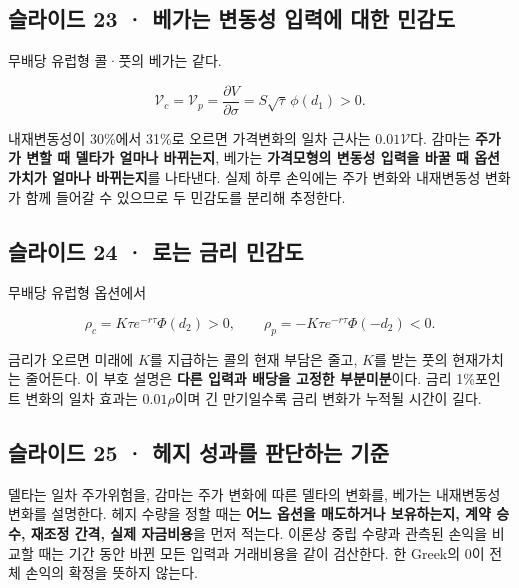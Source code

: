 \documentclass[11pt,a4paper]{article}
\begin{document}
\subsection{슬라이드 23 · 베가는 변동성 입력에 대한 민감도}
무배당 유럽형 콜·풋의 베가는 같다.\par

\[
\mathcal V_c=\mathcal V_p
=\frac{\partial V}{\partial\sigma}
=S\sqrt\tau\,\phi(d_1)>0.
\]

내재변동성이 30\%에서 31\%로 오르면 가격변화의 일차 근사는 $0.01\mathcal V$다. 감마는 \textbf{주가가 변할 때 델타가 얼마나 바뀌는지}, 베가는 \textbf{가격모형의 변동성 입력을 바꿀 때 옵션가치가 얼마나 바뀌는지}를 나타낸다. 실제 하루 손익에는 주가 변화와 내재변동성 변화가 함께 들어갈 수 있으므로 두 민감도를 분리해 추정한다.\par

\subsection{슬라이드 24 · 로는 금리 민감도}
무배당 유럽형 옵션에서\par

\[
\rho_c=K\tau e^{-r\tau}\Phi(d_2)>0,\qquad
\rho_p=-K\tau e^{-r\tau}\Phi(-d_2)<0.
\]

금리가 오르면 미래에 $K$를 지급하는 콜의 현재 부담은 줄고, $K$를 받는 풋의 현재가치는 줄어든다. 이 부호 설명은 \textbf{다른 입력과 배당을 고정한 부분미분}이다. 금리 1\%포인트 변화의 일차 효과는 $0.01\rho$이며 긴 만기일수록 금리 변화가 누적될 시간이 길다.\par

\subsection{슬라이드 25 · 헤지 성과를 판단하는 기준}
델타는 일차 주가위험을, 감마는 주가 변화에 따른 델타의 변화를, 베가는 내재변동성 변화를 설명한다. 헤지 수량을 정할 때는 \textbf{어느 옵션을 매도하거나 보유하는지, 계약 승수, 재조정 간격, 실제 자금비용}을 먼저 적는다. 이론상 중립 수량과 관측된 손익을 비교할 때는 기간 동안 바뀐 모든 입력과 거래비용을 같이 검산한다. 한 Greek의 0이 전체 손익의 확정을 뜻하지 않는다.\par
\end{document}
